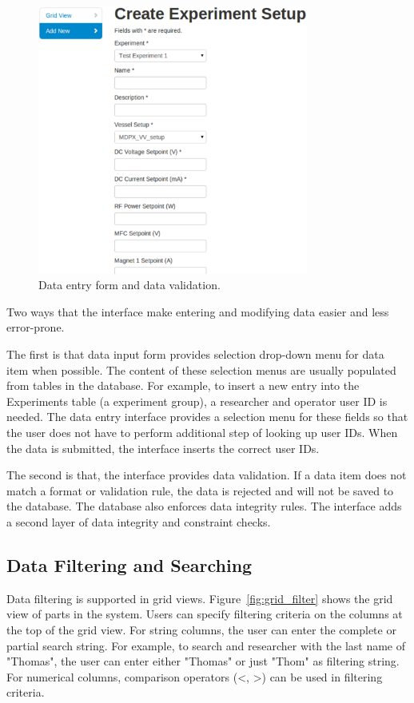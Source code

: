 \documentclass{sig-alternate}
\begin{document}
\begin{figure}[h]
\centering
\includegraphics[width=3.5in]{create_experiment_setup.pdf}
\caption{Data entry form and data validation.\label{fig:create_exp_setup}}
\end{figure}

Two ways that the interface make entering and modifying data easier and less error-prone.

The first is that data input form provides selection drop-down menu for data item when possible. The content of these selection menus are usually populated from tables in the database. For example, to insert a new entry into the Experiments table (a experiment group), a researcher and operator user ID is needed. The data entry interface provides a selection menu for these fields so that the user does not have to perform additional step of looking up user IDs. When the data is submitted, the interface inserts the correct user IDs.

The second is that, the interface provides data validation. If a data item does not match a format or validation rule, the data is rejected and will not be saved to the database. The database also enforces data integrity rules. The interface adds a second layer of data integrity and constraint checks.

\subsection{Data Filtering and Searching}

Data filtering is supported in grid views. Figure~\ref{fig:grid_filter} shows the grid view of parts in the system. Users can specify filtering criteria on the columns at the top of the grid view. For string columns, the user can enter the complete or partial search string. For example, to search and researcher with the last name of "Thomas", the user can enter either "Thomas" or just "Thom" as filtering string. For numerical columns, comparison operators (<, >) can be used in filtering criteria.
\end{document}
